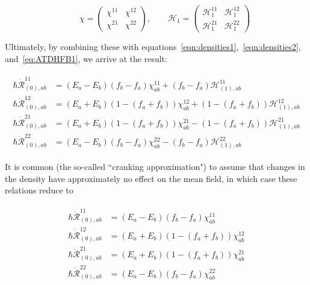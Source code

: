 \begin{equation}
\qquad \chi = 
\left(\begin{array}{cc}
\chi^{11} & \chi^{12} \\
\chi^{21} & \chi^{22}
\end{array}\right),
\qquad \mathcal{H}_1 = 
\left(\begin{array}{cc}
\mathcal{H}_1^{11} & \mathcal{H}_1^{12} \\
\mathcal{H}_1^{21} & \mathcal{H}_1^{22}
\end{array}\right)
\end{equation}

\noindent Ultimately, by combining these with equations~\eqref{eqn:densities1},~\eqref{eqn:densities2}, and~\eqref{eq:ATDHFB1}, we arrive at the result:

\begin{align}\label{eqn:chi-rdot_uncranked}
\begin{aligned}
\hbar \dot{\mathcal{R}}_{(0),ab}^{11} &= (E_a-E_b)(f_b-f_a)\chi_{ab}^{11} + (f_b-f_a)\mathcal{H}^{11}_{(1),ab} \\
\hbar \dot{\mathcal{R}}_{(0),ab}^{12} &= (E_a+E_b)\left(1-(f_a+f_b)\right)\chi_{ab}^{12} + \left(1-(f_a+f_b)\right)\mathcal{H}^{12}_{(1),ab} \\
\hbar \dot{\mathcal{R}}_{(0),ab}^{21} &= (E_a+E_b)\left(1-(f_a+f_b)\right)\chi_{ab}^{21} - \left(1-(f_a+f_b)\right)\mathcal{H}^{21}_{(1),ab} \\
\hbar \dot{\mathcal{R}}_{(0),ab}^{22} &= (E_a-E_b)(f_b-f_a)\chi_{ab}^{22} - (f_b-f_a)\mathcal{H}^{22}_{(1),ab}
\end{aligned}
\end{align}

It is common (the so-called ``cranking approximation") to assume that changes in the density have approximately no effect on the mean field, in which case these relations reduce to

\begin{tcolorbox}
	\begin{align}\label{eqn:chi-rdot}
	\begin{aligned}
	\hbar \dot{\mathcal{R}}_{(0),ab}^{11} &= (E_a-E_b)(f_b-f_a)\chi_{ab}^{11} \\
	\hbar \dot{\mathcal{R}}_{(0),ab}^{12} &= (E_a+E_b)\left(1-(f_a+f_b)\right)\chi_{ab}^{12} \\
	\hbar \dot{\mathcal{R}}_{(0),ab}^{21} &= (E_a+E_b)\left(1-(f_a+f_b)\right)\chi_{ab}^{21} \\
	\hbar \dot{\mathcal{R}}_{(0),ab}^{22} &= (E_a-E_b)(f_b-f_a)\chi_{ab}^{22}
	\end{aligned}
	\end{align}
\end{tcolorbox}

